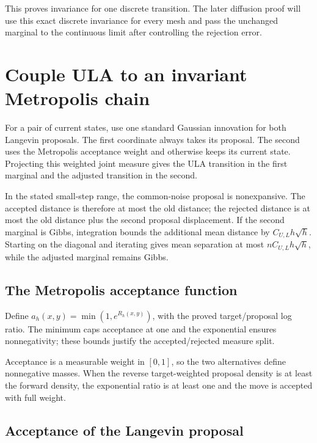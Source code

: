 \documentclass[11pt,a4paper]{report}
\begin{document}
This proves invariance for one discrete transition. The later diffusion proof will use this exact discrete invariance for every mesh and pass the unchanged marginal to the continuous limit after controlling the rejection error.

\section{\texorpdfstring{Couple ULA to an invariant Metropolis chain}{Couple ULA to an invariant Metropolis chain}}
\label{proof-module-UnadjustedLangevin-MALACoupling-lean}


For a pair of current states, use one standard Gaussian innovation for both Langevin proposals. The first coordinate always takes its proposal. The second uses the Metropolis acceptance weight and otherwise keeps its current state. Projecting this weighted joint measure gives the ULA transition in the first marginal and the adjusted transition in the second.



In the stated small-step range, the common-noise proposal is nonexpansive. The accepted distance is therefore at most the old distance; the rejected distance is at most the old distance plus the second proposal displacement. If the second marginal is Gibbs, integration bounds the additional mean distance by \(C_{U,L}h\sqrt h\). Starting on the diagonal and iterating gives mean separation at most \(nC_{U,L}h\sqrt h\), while the adjusted marginal remains Gibbs.

\subsection{\texorpdfstring{The Metropolis acceptance function}{The Metropolis acceptance function}}
\label{report-step-UnadjustedLangevin-MALACoupling-lean-1}


Define \(a_h(x,y)=\min(1,e^{R_h(x,y)})\), with the proved target/\allowbreak{}proposal log ratio. The minimum caps acceptance at one and the exponential ensures nonnegativity; these bounds justify the accepted/\allowbreak{}rejected measure split.



Acceptance is a measurable weight in \([0,1]\), so the two alternatives define nonnegative masses. When the reverse target-weighted proposal density is at least the forward density, the exponential ratio is at least one and the move is accepted with full weight.

\subsection{\texorpdfstring{Acceptance of the Langevin proposal}{Acceptance of the Langevin proposal}}
\label{report-step-UnadjustedLangevin-MALACoupling-lean-2}
\end{document}
